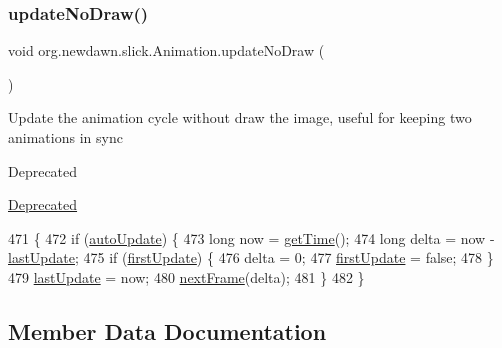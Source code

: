 \subsubsection{\texorpdfstring{update\+No\+Draw()}{updateNoDraw()}}
{\footnotesize\ttfamily void org.\+newdawn.\+slick.\+Animation.\+update\+No\+Draw (\begin{DoxyParamCaption}{ }\end{DoxyParamCaption})\hspace{0.3cm}{\ttfamily [inline]}}

Update the animation cycle without draw the image, useful for keeping two animations in sync

\begin{DoxyRefDesc}{Deprecated}
\item[\mbox{\hyperlink{deprecated__deprecated000001}{Deprecated}}]\end{DoxyRefDesc}

\begin{DoxyCode}
471                                \{
472         \textcolor{keywordflow}{if} (\mbox{\hyperlink{classorg_1_1newdawn_1_1slick_1_1_animation_a343dbff14a050cf8753e9a67746deede}{autoUpdate}}) \{
473             \textcolor{keywordtype}{long} now = \mbox{\hyperlink{classorg_1_1newdawn_1_1slick_1_1_animation_ad5d5822b4aa1ac0ed36fdb06d8c3a9c5}{getTime}}();
474             \textcolor{keywordtype}{long} delta = now - \mbox{\hyperlink{classorg_1_1newdawn_1_1slick_1_1_animation_a5f6bf06ad6ea524d644858261b221794}{lastUpdate}};
475             \textcolor{keywordflow}{if} (\mbox{\hyperlink{classorg_1_1newdawn_1_1slick_1_1_animation_a1ddf04d31c943c41b82efbd1f2179d77}{firstUpdate}}) \{
476                 delta = 0;
477                 \mbox{\hyperlink{classorg_1_1newdawn_1_1slick_1_1_animation_a1ddf04d31c943c41b82efbd1f2179d77}{firstUpdate}} = \textcolor{keyword}{false};
478             \}
479             \mbox{\hyperlink{classorg_1_1newdawn_1_1slick_1_1_animation_a5f6bf06ad6ea524d644858261b221794}{lastUpdate}} = now;
480             \mbox{\hyperlink{classorg_1_1newdawn_1_1slick_1_1_animation_ae23662cd09dfe23e566c45b9bf85d97a}{nextFrame}}(delta);
481         \}
482     \}
\end{DoxyCode}


\subsection{Member Data Documentation}
\mbox{\label{classorg_1_1newdawn_1_1slick_1_1_animation_a343dbff14a050cf8753e9a67746deede}} 
